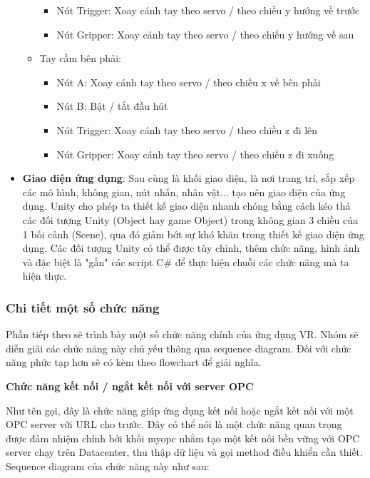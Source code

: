 \begin{itemize}
\begin{itemize}
\begin{itemize}
            \item Nút Trigger: Xoay cánh tay theo servo / theo chiều y hướng về trước
            \item Nút Gripper: Xoay cánh tay theo servo / theo chiều y hướng về sau
        \end{itemize}
        \item Tay cầm bên phải:
        \begin{itemize}
            \item Nút A: Xoay cánh tay theo servo / theo chiều x về bên phải
            \item Nút B: Bật / tắt đầu hút
            \item Nút Trigger: Xoay cánh tay theo servo / theo chiều z đi lên
            \item Nút Gripper: Xoay cánh tay theo servo / theo chiều z đi xuống
        \end{itemize}
    \end{itemize}
    \item \textbf{Giao diện ứng dụng}: Sau cùng là khối giao diện, là nơi trang trí, sắp xếp các mô hình, không gian, nút nhấn, nhân vật... tạo nên giao diện của ứng dụng. Unity cho phép ta thiết kế giao diện nhanh chóng bằng cách kéo thả các đối tượng Unity (Object hay game Object) trong không gian 3 chiều của 1 bối cảnh (Scene), qua đó giảm bớt sự khó khăn trong thiết kế giao diện ứng dụng. Các đối tượng Unity có thể được tùy chỉnh, thêm chức năng, hình ảnh và đặc biệt là "gắn" các script C\# để thực hiện chuỗi các chức năng mà ta hiện thực.
\end{itemize}

\subsubsection{Chi tiết một số chức năng}

Phần tiếp theo sẽ trình bày một số chức năng chính của ứng dụng VR. Nhóm sẽ diễn giải các chức năng này chủ yếu thông qua sequence diagram. Đối với chức năng phức tạp hơn sẽ có kèm theo flowchart để giải nghĩa.

\textbf{Chức năng kết nối / ngắt kết nối với server OPC} 

Như tên gọi, đây là chức năng giúp ứng dụng kết nối hoặc ngắt kết nối với một OPC server với URL cho trước. Đây có thể nói là một chức năng quan trọng được đảm nhiệm chính bởi khối myopc nhằm tạo một kết nối bền vững với OPC server chạy trên Datacenter, thu thập dữ liệu và gọi method điều khiển cần thiết. Sequence diagram của chức năng này như sau:


